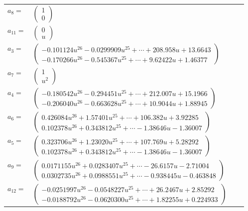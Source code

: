 \documentclass[1p]{elsarticle_modified}
\theoremstyle{definition}
\begin{document}
\begin{tabular}{m{7pt} m{180pt} m{7pt} m{180pt} }
\flushright $a_{8}=$&$\begin{pmatrix}1\\0\end{pmatrix}$ \\
\flushright $a_{11}=$&$\begin{pmatrix}0\\u\end{pmatrix}$ \\
\flushright $a_{3}=$&$\begin{pmatrix}-0.101124 u^{26}-0.0299909 u^{25}+\cdots+208.958 u+13.6643\\-0.170266 u^{26}-0.545367 u^{25}+\cdots+9.62422 u+1.46377\end{pmatrix}$ \\
\flushright $a_{7}=$&$\begin{pmatrix}1\\u^2\end{pmatrix}$ \\
\flushright $a_{4}=$&$\begin{pmatrix}-0.180542 u^{26}-0.294451 u^{25}+\cdots+212.007 u+15.1966\\-0.206040 u^{26}-0.663628 u^{25}+\cdots+10.9044 u+1.88945\end{pmatrix}$ \\
\flushright $a_{6}=$&$\begin{pmatrix}0.426084 u^{26}+1.57401 u^{25}+\cdots+106.382 u+3.92285\\0.102378 u^{26}+0.343812 u^{25}+\cdots-1.38646 u-1.36007\end{pmatrix}$ \\
\flushright $a_{5}=$&$\begin{pmatrix}0.323706 u^{26}+1.23020 u^{25}+\cdots+107.769 u+5.28292\\0.102378 u^{26}+0.343812 u^{25}+\cdots-1.38646 u-1.36007\end{pmatrix}$ \\
\flushright $a_{9}=$&$\begin{pmatrix}0.0171155 u^{26}+0.0283407 u^{25}+\cdots-26.6157 u-2.71004\\0.0302735 u^{26}+0.0988551 u^{25}+\cdots-0.938445 u-0.463848\end{pmatrix}$ \\
\flushright $a_{12}=$&$\begin{pmatrix}-0.0251997 u^{26}-0.0548227 u^{25}+\cdots+26.2467 u+2.85292\\-0.0188792 u^{26}-0.0620300 u^{25}+\cdots+1.82255 u+0.224933\end{pmatrix}$ \\

\end{tabular}
\end{document}
